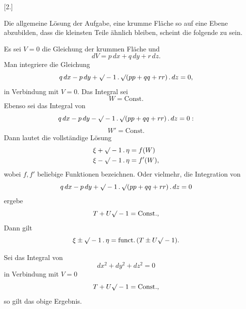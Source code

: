%
\begin{center}[2.]\end{center}

Die allgemeine Lösung der Aufgabe, eine krumme Fläche so auf eine Ebene abzubilden, dass die kleinsten Teile ähnlich bleiben, scheint die folgende zu sein.

Es sei $V=0$ die Gleichung der krummen Fläche und
\[
dV=p\,dx+q\,dy+r\,dz.
\]
Man integriere die Gleichung
\[
q\,dx-p\,dy+\mathord{\surd}-1\,.\,\mathord{\surd}(pp+qq+rr)\,.\,dz=0,
\]
in Verbindung mit $V=0$. Das Integral sei
\[
W=\mathrm{Const.}
\]
Ebenso sei das Integral von
\[
q\,dx-p\,dy-\mathord{\surd}-1\,.\,\mathord{\surd}(pp+qq+rr)\,.\,dz=0:
\]
\[
W'=\mathrm{Const.}
\]
Dann lautet die vollständige Lösung
\[
\begin{aligned}
\xi+\mathord{\surd}-1\,.\,\eta&=f(W)\\
\xi-\mathord{\surd}-1\,.\,\eta&=f'(W),
\end{aligned}
\]
wobei $f,f'$ beliebige Funktionen bezeichnen. Oder vielmehr, die Integration von
\[
q\,dx-p\,dy+\mathord{\surd}-1\,.\,\mathord{\surd}(pp+qq+rr)\,.\,dz=0
\]
ergebe
\[
T+U\mathord{\surd}-1=\mathrm{Const.},
\]
Dann gilt
\[
\xi\pm\mathord{\surd}-1\,.\,\eta=\mathrm{funct.}\,(T\pm U\mathord{\surd}-1).
\]

Sei das Integral von
\[
dx^2+dy^2+dz^2=0
\]
in Verbindung mit $V=0$
\[
T+U\mathord{\surd}-1=\mathrm{Const.},
\]
so gilt das obige Ergebnis.
